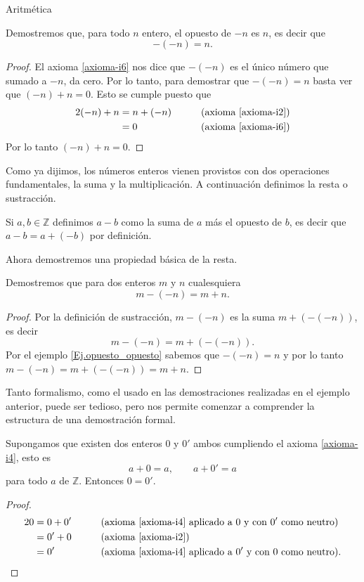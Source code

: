 \begin{section}{Aritmética}
\begin{ejemplo}\label{Ej.opuesto_opuesto} Demostremos que, para todo $n$ entero, el opuesto de $-n$ es $n$, es decir que 
$$-(-n) = n.$$ 
\end{ejemplo}
\begin{proof} El axioma \ref{axioma-i6} nos dice que $-(-n)$ es el único número que sumado a $-n$, da cero.  Por lo tanto, para demostrar que $-(-n) = n$ basta ver que $(-n)+n=0$. Esto se cumple puesto que 
\begin{alignat*}2
(-n)+n&=n+(-n) &\qquad &\text{(axioma \ref{axioma-i2})} \\
&=0&\qquad &\text{(axioma \ref{axioma-i6})}
\end{alignat*}
Por lo tanto  $(-n)+n=0$.
\end{proof}

Como ya dijimos, los números enteros vienen provistos con dos operaciones fundamentales, la suma y la multiplicación.
A continuación definimos la resta o sustracción. 

\begin{definicion} Si $a,b\in\mathbb{Z}$ definimos $a-b$ como la suma de $a$ más el opuesto de $b$, es decir que  $a-b=a+(-b)$ por definición.  
\end{definicion}

Ahora demostremos una propiedad básica de la resta.

\begin{ejemplo*} Demostremos que para dos enteros $m$ y $n$ cualesquiera
$$m-(-n) = m+n.$$ 
\end{ejemplo*}
\begin{proof} Por la definición de sustracción, $m-(-n)$ es la suma $m+(-(-n))$, es decir 
$$m-(-n)=m+(-(-n)).$$ 
Por el ejemplo \ref{Ej.opuesto_opuesto} sabemos que $-(-n)=n$ y por lo tanto $m-(-n)=m+(-(-n))=m+n$.
\end{proof}

Tanto formalismo, como el usado en las  demostraciones realizadas en el ejemplo anterior, puede ser tedioso, pero nos permite comenzar a comprender la estructura de una demostración formal. 



\begin{proposicion} Supongamos que existen dos enteros $0$ y $0'$ ambos cumpliendo el  axioma \ref{axioma-i4}, esto es
$$
a+0= a, \qquad a+0'=a
$$
para todo $a$ de $\mathbb Z$.  Entonces $0= 0'$. 
\end{proposicion}
\begin{proof}
\begin{alignat*}2
0 &= 0 + 0'&\qquad &\text{(axioma \ref{axioma-i4} aplicado a $0$ y con $0'$ como neutro)} \\
&=0'+0&\qquad &\text{(axioma \ref{axioma-i2})}\\
&= 0' &\qquad &\text{(axioma \ref{axioma-i4} aplicado a $0'$ y con $0$ como neutro)}.
\end{alignat*}
\end{proof}



\end{section}
